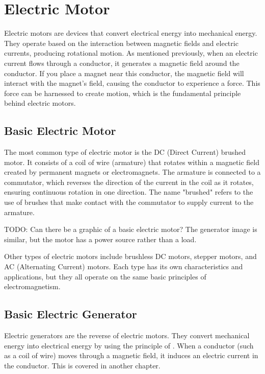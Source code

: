\chapter{Electric Motor}

Electric motors are devices that convert electrical energy into mechanical energy. They operate
based on the interaction between magnetic fields and electric currents, producing rotational
motion. As mentioned previously, when an electric current flows through a conductor, it generates
a magnetic field around the conductor. If you place a magnet near this conductor, the
magnetic field will interact with the magnet's field, causing the conductor to experience a force.
This force can be harnessed to create motion, which is the fundamental principle behind electric motors.

\section{Basic Electric Motor}

The most common type of electric motor is the DC (Direct Current) brushed motor. It consists of a coil of wire
(armature) that rotates within a magnetic field created by permanent magnets or electromagnets. The armature 
is connected to a commutator, which reverses the direction of the current in the coil as it rotates, ensuring 
continuous rotation in one direction. The name "brushed" refers to the use of brushes that make contact with 
the commutator to supply current to the armature. 

TODO: Can there be a graphic of a basic electric motor? The generator image is similar, but the motor has a power source rather than a load.

Other types of electric motors include brushless DC motors, stepper motors, and AC (Alternating Current) motors. Each type has its own
characteristics and applications, but they all operate on the same basic principles of electromagnetism.

\section{Basic Electric Generator}

Electric generators are the reverse of electric motors. They convert mechanical energy into electrical energy by
using the principle of . When a conductor (such as a coil of wire) moves through a magnetic field, 
it induces an electric current in the conductor. This is covered in another chapter.

